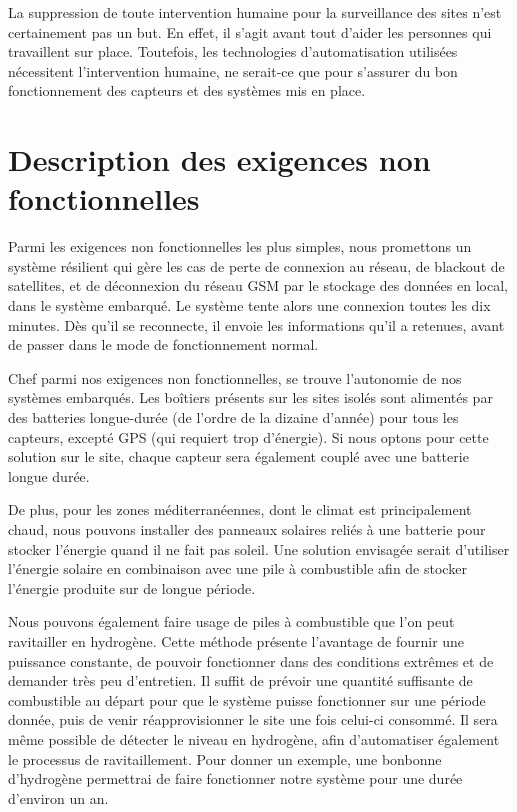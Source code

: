 La suppression de  toute intervention humaine pour la surveillance des sites n’est certainement pas un but. En effet, il s’agit avant tout d’aider les personnes qui travaillent sur place. Toutefois, les technologies d’automatisation utilisées nécessitent l’intervention humaine, ne serait-ce que pour s’assurer du bon fonctionnement des capteurs et des systèmes mis en place.

\section{Description des exigences non fonctionnelles}

Parmi les exigences non fonctionnelles les plus simples, nous promettons un système résilient qui gère les cas de perte de connexion au réseau, de blackout de satellites, et de déconnexion du réseau GSM par le stockage des données en local, dans le système embarqué. Le système tente alors une connexion toutes les dix minutes. Dès qu’il se reconnecte, il envoie les informations qu’il a retenues, avant de passer dans le mode de fonctionnement normal.

Chef parmi nos exigences non fonctionnelles, se trouve l’autonomie de nos systèmes embarqués. Les boîtiers présents sur les sites isolés sont alimentés par des batteries longue-durée (de l’ordre de la dizaine d’année) pour tous les capteurs, excepté GPS (qui requiert trop d’énergie). Si nous optons pour cette solution sur le site, chaque capteur sera également couplé avec une batterie longue durée.

De plus, pour les zones méditerranéennes, dont le climat est principalement chaud, nous pouvons installer des panneaux solaires reliés à une batterie pour stocker l’énergie quand il ne fait pas soleil. Une solution envisagée serait d’utiliser l’énergie solaire en combinaison avec une pile à combustible afin de stocker l’énergie produite sur de longue période.

Nous pouvons également faire usage de piles à combustible que l’on peut ravitailler en hydrogène. Cette méthode présente l’avantage de fournir une puissance constante, de pouvoir fonctionner dans des conditions extrêmes et de demander très peu d’entretien. Il suffit de prévoir une quantité suffisante de combustible au départ pour que le système puisse fonctionner sur une période donnée, puis de venir réapprovisionner le site une fois celui-ci consommé. Il sera même possible de détecter le niveau en hydrogène, afin d’automatiser également le processus de ravitaillement. Pour donner un exemple, une bonbonne d’hydrogène permettrai de faire fonctionner notre système pour une durée d’environ un an. 

